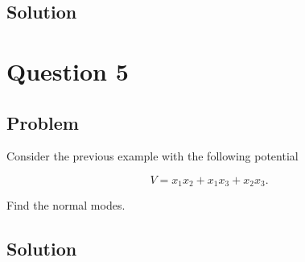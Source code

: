\documentclass[12pt]{article}
\begin{document}
\subsection{Solution}

\newpage
\section{Question 5}

\subsection{Problem}

Consider the previous example with the following potential

\[
    V=x_1 x_2+x_1 x_3+x_2 x_3 .
\]

Find the normal modes.

\subsection{Solution}



\newpage


\nocite{El-Deeb_PEU-356_Assignments}
\end{document}
